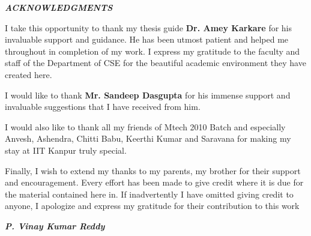 \begin{center}
\begin{large}
{\it{\bf ACKNOWLEDGMENTS} }
\end{large}
\end{center} 
I take this opportunity to thank my thesis guide \textbf{Dr. Amey Karkare} for his invaluable support and
guidance. He has been utmost patient and helped me throughout in completion of my work. I express my gratitude
to the faculty and staff of the Department of CSE for the beautiful academic environment they have created here.

I would like to thank \textbf{Mr. Sandeep Dasgupta} for his immense support and invaluable suggestions that I have
received from him. 

I would also like to thank all my friends of Mtech 2010 Batch and especially Anvesh, Ashendra, Chitti Babu, Keerthi Kumar and Saravana 
for making my stay at IIT Kanpur truly special. 

Finally, I wish to extend my thanks to my parents, my brother for their support and encouragement.
Every effort has been made to give credit where it is due for the material contained
here in. If inadvertently I have omitted giving credit to anyone, I apologize and express
my gratitude for their contribution to this work

\vskip 4mm
\begin{flushright}
\textit{\textbf{P. Vinay Kumar Reddy}}
\end{flushright}
